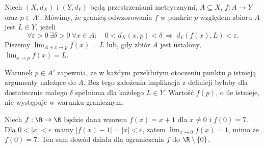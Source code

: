 \begin{definicja}
\label{ma1:def:function-limit}
Niech $(X,d_X)$ i $(Y,d_Y)$ będą przestrzeniami metrycznymi, $A\subseteq X$, $f:A\to Y$ oraz $p\in A'$. Mówimy, że granicą odwzorowania $f$ w punkcie $p$ względem zbioru $A$ jest $L\in Y$, jeżeli
\[
 \forall\varepsilon>0\ \exists\delta>0\ \forall x\in A:
 \quad 0<d_X(x,p)<\delta
 \ \Longrightarrow\ d_Y(f(x),L)<\varepsilon.
\]
Piszemy $\lim_{A\ni x\to p}f(x)=L$ lub, gdy zbiór $A$ jest ustalony, $\lim_{x\to p}f(x)=L$.
\end{definicja}
Warunek $p\in A'$ zapewnia, że w każdym przekłutym otoczeniu punktu $p$ istnieją argumenty należące do $A$. Bez tego założenia implikacja z definicji byłaby dla dostatecznie małego $\delta$ spełniona dla każdego $L\in Y$. Wartość $f(p)$, o ile istnieje, nie występuje w warunku granicznym.

\begin{przyklad}
\label{ma1:ex:removable-value}
Niech $f:\R\to\R$ będzie dana wzorem $f(x)=x+1$ dla $x\ne0$ i $f(0)=7$. Dla $0<|x|<\varepsilon$ mamy $|f(x)-1|=|x|<\varepsilon$, zatem $\lim_{x\to0}f(x)=1$, mimo że $f(0)=7$. Ten sam dowód działa dla ograniczenia $f$ do $\R\setminus\{0\}$.
\end{przyklad}

